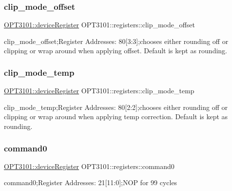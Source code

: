 \subsubsection{\texorpdfstring{clip\+\_\+mode\+\_\+offset}{clip\_mode\_offset}}
{\footnotesize\ttfamily \mbox{\hyperlink{class_o_p_t3101_1_1device_register}{O\+P\+T3101\+::device\+Register}} O\+P\+T3101\+::registers\+::clip\+\_\+mode\+\_\+offset}



clip\+\_\+mode\+\_\+offset;Register Addresses\+: 80\mbox{[}3\+:3\mbox{]};chooses either rounding off or clipping or wrap around when applying offset. Default is kept as rounding. 

\mbox{\label{class_o_p_t3101_1_1registers_abe6e94cb9cc2611cca3f47a29447b92c}} 
\subsubsection{\texorpdfstring{clip\+\_\+mode\+\_\+temp}{clip\_mode\_temp}}
{\footnotesize\ttfamily \mbox{\hyperlink{class_o_p_t3101_1_1device_register}{O\+P\+T3101\+::device\+Register}} O\+P\+T3101\+::registers\+::clip\+\_\+mode\+\_\+temp}



clip\+\_\+mode\+\_\+temp;Register Addresses\+: 80\mbox{[}2\+:2\mbox{]};chooses either rounding off or clipping or wrap around when applying temp correction. Default is kept as rounding. 

\mbox{\label{class_o_p_t3101_1_1registers_a8f0a2183e0efe165980fcf47ffeeec76}} 
\subsubsection{\texorpdfstring{command0}{command0}}
{\footnotesize\ttfamily \mbox{\hyperlink{class_o_p_t3101_1_1device_register}{O\+P\+T3101\+::device\+Register}} O\+P\+T3101\+::registers\+::command0}



command0;Register Addresses\+: 21\mbox{[}11\+:0\mbox{]};N\+OP for 99 cycles 

